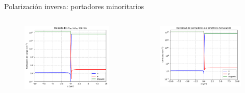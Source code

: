\documentclass[aspectratio=169,xcolor=dvipsnames]{beamer}
\begin{document}
\begin{frame}{Polarización inversa: portadores minoritarios}
    
    \begin{columns}
        \begin{column}{0.5\textwidth}
            \begin{figure}
                \includegraphics[width=0.90\linewidth]{Teorico/Bandas_Minoritarios-Inversa.pdf}
            \end{figure}
        \end{column}
        \begin{column}{0.5\textwidth}
            \begin{figure}
                \includegraphics[width=0.90\linewidth]{Inversa/Bandas_Minoritarios-Inversa.pdf}
            \end{figure}
        \end{column}

\end{columns}
\end{frame}
\end{document}

